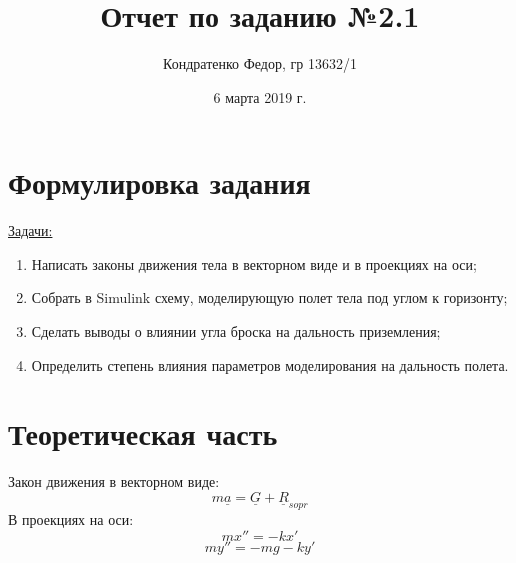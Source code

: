 \documentclass{article}
\date{6 марта 2019 г.}
\author{Кондратенко Федор, гр 13632/1}
\title{Отчет по заданию №2.1}
\begin{document}
	\maketitle
	\section{Формулировка задания\\}
	\underline{Задачи:}
	\begin{enumerate}
		\item Написать законы движения тела в векторном виде и в проекциях на оси;
		\item Собрать в Simulink схему, моделирующую полет тела под углом к горизонту;
		\item Сделать выводы о влиянии угла броска на дальность приземления;
		\item  Определить степень влияния параметров моделирования на дальность полета.
	\end{enumerate}
	\section{Теоретическая часть}
	Закон движения в векторном виде:
	$$m\underline a = \underline G + \underline R_{sopr}$$
	В проекциях на оси:
	$$mx'' = -kx'$$
	$$my'' = -mg-ky'$$
\end{document}

